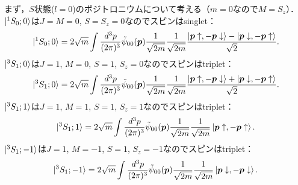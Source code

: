 まず，$S$状態($l=0$)のポジトロニウムについて考える（$m=0$なので$M=S_z$）．
$\ket{^1S_0; 0}$は$J=M=0$, $S=S_z=0$なのでスピンはsinglet：
\begin{align}
  \ket{^1S_0; 0} = 2\sqrt{m} \int \frac{d^3p}{(2\pi)^3} \tilde{\psi}_{00}(\boldsymbol{p}) \frac{1}{\sqrt{2m}} \frac{1}{\sqrt{2m}}
  \frac{\ket{\boldsymbol{p} \uparrow, -\boldsymbol{p} \downarrow} - \ket{\boldsymbol{p} \downarrow, -\boldsymbol{p} \uparrow}}{\sqrt{2}} .
  \label{prob5_4a_1S_0;0}
\end{align}
$\ket{^3S_1; 0}$は$J=1$, $M=0$, $S=1$, $S_z=0$なのでスピンはtriplet：
\begin{align*}
  \ket{^3S_1; 0} = 2\sqrt{m} \int \frac{d^3p}{(2\pi)^3} \tilde{\psi}_{00}(\boldsymbol{p}) \frac{1}{\sqrt{2m}} \frac{1}{\sqrt{2m}}
  \frac{\ket{\boldsymbol{p} \uparrow, -\boldsymbol{p} \downarrow} + \ket{\boldsymbol{p} \downarrow, -\boldsymbol{p} \uparrow}}{\sqrt{2}} .
\end{align*}
$\ket{^3S_1; 1}$は$J=1$, $M=1$, $S=1$, $S_z=1$なのでスピンはtriplet：
\begin{align*}
  \ket{^3S_1; 1} = 2\sqrt{m} \int \frac{d^3p}{(2\pi)^3} \tilde{\psi}_{00}(\boldsymbol{p}) \frac{1}{\sqrt{2m}} \frac{1}{\sqrt{2m}} \ket{\boldsymbol{p} \uparrow, -\boldsymbol{p} \uparrow} .
\end{align*}
$\ket{^3S_1; -1}$は$J=1$, $M=-1$, $S=1$, $S_z=-1$なのでスピンはtriplet：
\begin{align*}
  \ket{^3S_1; -1} = 2\sqrt{m} \int \frac{d^3p}{(2\pi)^3} \tilde{\psi}_{00}(\boldsymbol{p}) \frac{1}{\sqrt{2m}} \frac{1}{\sqrt{2m}} \ket{\boldsymbol{p} \downarrow, -\boldsymbol{p} \downarrow} .
\end{align*}

